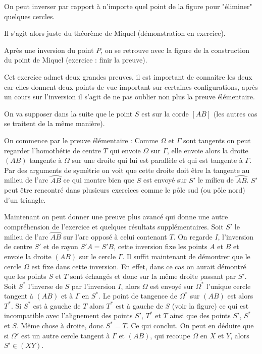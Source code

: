 \begin{sol}

On peut inverser par rapport à n'importe quel point de la figure pour "éliminer" quelques cercles.


Il s'agit alors juste du théorème de Miquel (démonstration en exercice).
\end{sol}

\begin{sol}

Après une inversion du point $P$, on se retrouve avec la figure de la construction du point de Miquel (exercice : finir la preuve).
\end{sol}

\begin{sol}

Cet exercice admet deux grandes preuves, il est important de connaitre les deux car elles donnent deux points de vue important sur certaines configurations, après un cours sur l'inversion il s'agit de ne pas oublier non plus la preuve élémentaire.

On va supposer dans la suite que le point $S$ est sur la corde $[AB]$ (les autres cas se traitent de la même manière).

On commence par le preuve élémentaire : Comme $\Omega$ et $\Gamma$ sont tangents on peut regarder l'homothétie de centre $T$ qui envoie $\Omega$ sur $\Gamma$, elle envoie alors la droite $(AB)$ tangente à $\Omega$ sur une droite qui lui est parallèle et qui est tangente à $\Gamma$. Par des arguments de symétrie on voit que cette droite doit être la tangente au milieu de l'arc $\wideparen{AB}$ ce qui montre bien que $S$ est envoyé sur $S'$ le milieu de $\wideparen{AB}$. $S'$ peut être rencontré dans plusieurs exercices comme le pôle sud (ou pôle nord) d'un triangle.

Maintenant on peut donner une preuve plus avancé qui donne une autre compréhension de l'exercice et quelques résultats supplémentaires. Soit $S'$ le milieu de l'arc $\wideparen{AB}$ sur l'arc opposé à celui contenant $T$. On regarde $I$, l'inversion de centre $S'$ et de rayon $S'A=S'B$, cette inversion fixe les points $A$ et $B$ et envoie la droite $(AB)$ sur le cercle $\Gamma$. Il suffit maintenant de démontrer que le cercle $\Omega$ est fixe dans cette inversion. En effet, dans ce cas on aurait démontré que les points $S$ et $T$ sont échangés et donc sur la même droite passant par $S'$. Soit $S^*$ l'inverse de $S$ par l'inversion $I$, alors $\Omega$ est envoyé sur $\Omega^*$ l'unique cercle tangent à $(AB)$ et à $\Gamma$ en $S^*$. Le point de tangence de $\Omega^*$ sur $(AB)$ est alors $T^*$. Si $S^*$ est à gauche de $T$ alors $T^*$ est à gauche de $S$ (voir la figure) ce qui est incompatible avec l'alignement des points $S'$, $T^*$ et $T$ ainsi que des points $S'$, $S^*$ et $S$. Même chose à droite, donc $S^*=T$. Ce qui conclut. On peut en déduire que si $\Omega'$ est un autre cercle tangent à $\Gamma$ et $(AB)$, qui recoupe $\Omega$ en $X$ et $Y$, alors $S' \in (XY)$.
\end{sol}

